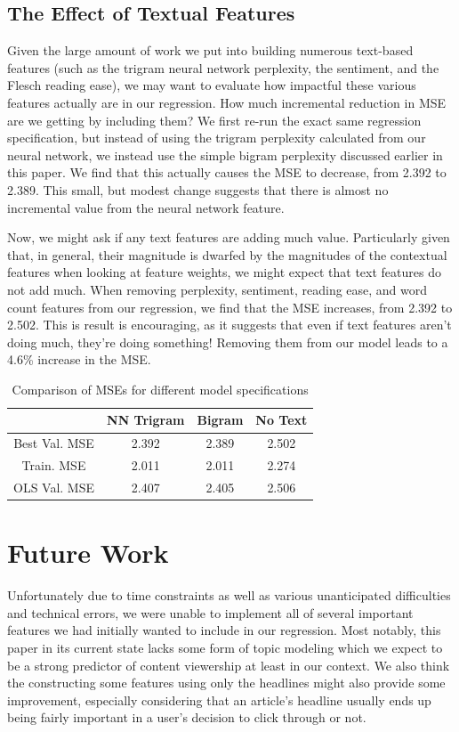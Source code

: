 \documentclass[fleqn,12pt]{SelfArx} %
\begin{document}
\subsection{The Effect of Textual Features}

Given the large amount of work we put into building numerous text-based features (such as the trigram neural network perplexity, the sentiment, and the Flesch reading ease), we may want to evaluate how impactful these various features actually are in our regression. How much incremental reduction in MSE are we getting by including them? We first re-run the exact same regression specification, but instead of using the trigram perplexity calculated from our neural network, we instead use the simple bigram perplexity discussed earlier in this paper. We find that this actually causes the MSE to decrease, from 2.392 to 2.389. This small, but modest change suggests that there is almost no incremental value from the neural network feature.

Now, we might ask if any text features are adding much value. Particularly given that, in general, their magnitude is dwarfed by the magnitudes of the contextual features when looking at feature weights, we might expect that text features do not add much. When removing perplexity, sentiment, reading ease, and word count features from our regression, we find that the MSE increases, from 2.392 to 2.502. This is result is encouraging, as it suggests that even if text features aren't doing much, they're doing something! Removing them from our model leads to a 4.6\% increase in the MSE.

\begin{table}[hbt]
\caption{Comparison of MSEs for different model specifications}
\centering
\begin{tabular}{cccc}
\toprule
  & NN Trigram & Bigram & No Text\\
\midrule
Best Val. MSE & 2.392 & 2.389 &  2.502 \\
Train. MSE & 2.011 & 2.011 &  2.274 \\
OLS Val. MSE & 2.407 & 2.405 & 2.506 \\ 
\bottomrule
\end{tabular}
\end{table}

\section{Future Work}
Unfortunately due to time constraints as well as various unanticipated difficulties and technical errors, we were unable to implement all of several important features we had initially wanted to include in our regression. Most notably, this paper in its current state lacks some form of topic modeling which we expect to be a strong predictor of content viewership at least in our context. We also think the constructing some features using only the headlines might also provide some improvement, especially considering that an article's headline usually ends up being fairly important in a user's decision to click through or not.
\end{document}
